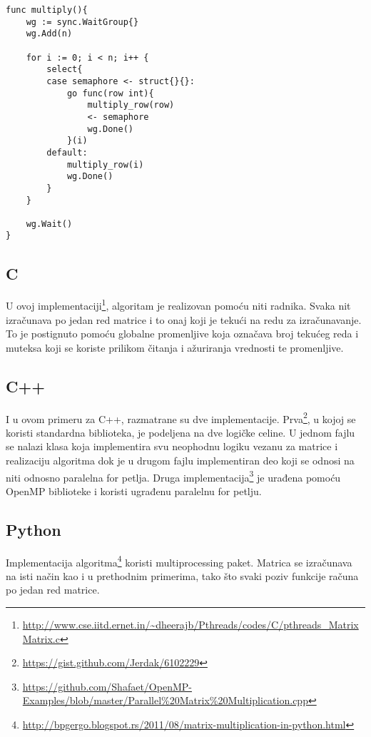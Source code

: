 \documentclass[12pt,oneside]{memoir}
\begin{document}
\begin{center}
\begin{lstlisting}[caption=Go implementacija konkurentne funkcije za množenje matrica,label={lst:matrix},float, backgroundcolor=\color{background}]
func multiply(){
	wg := sync.WaitGroup{}
	wg.Add(n)

	for i := 0; i < n; i++ {
		select{
		case semaphore <- struct{}{}:
			go func(row int){
				multiply_row(row)
				<- semaphore
				wg.Done()
			}(i)
		default:
			multiply_row(i)
			wg.Done()
		}
	}

	wg.Wait()
}
\end{lstlisting}
\end{center}

\subsection{C}
U ovoj implementaciji\footnote{\url{http://www.cse.iitd.ernet.in/~dheerajb/Pthreads/codes/C/pthreads_MatrixMatrix.c}}, algoritam je realizovan pomoću niti radnika. Svaka nit izračunava po jedan red matrice i to onaj koji je tekući na redu za izračunavanje. To je postignuto pomoću globalne promenljive koja označava broj tekućeg reda i muteksa koji se koriste prilikom čitanja i ažuriranja vrednosti te promenljive.

\subsection{C++}
I u ovom primeru za C++, razmatrane su dve implementacije. Prva\footnote{\url{https://gist.github.com/Jerdak/6102229}}, u kojoj se koristi standardna biblioteka, je podeljena na dve logičke celine. U jednom fajlu se nalazi klasa koja implementira svu neophodnu logiku vezanu za matrice i realizaciju algoritma dok je u drugom fajlu implementiran deo koji se odnosi na niti odnosno paralelna for petlja. Druga implementacija\footnote{\url{https://github.com/Shafaet/OpenMP-Examples/blob/master/Parallel\%20Matrix\%20Multiplication.cpp}} je urađena pomoću OpenMP biblioteke i koristi ugrađenu paralelnu for petlju. 

\subsection{Python}
Implementacija algoritma\footnote{\url{http://bpgergo.blogspot.rs/2011/08/matrix-multiplication-in-python.html}} koristi multiprocessing paket. Matrica se izračunava na isti način kao i u prethodnim primerima, tako što svaki poziv funkcije računa po jedan red matrice.  
\end{document}
